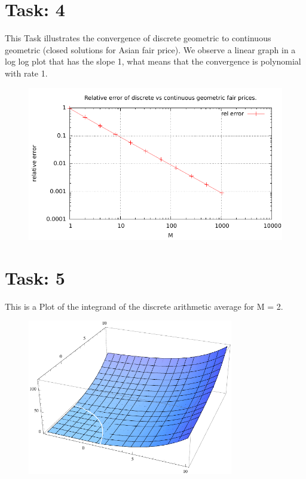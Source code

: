 \documentclass{article}
\begin{document}
\section*{Task: 4}
This Task illustrates the convergence of discrete geometric to continuous geometric (closed solutions for Asian fair price). We observe a linear graph in a log log plot that has the slope 1, what means that the convergence is polynomial with rate 1.
\begin{figure}[htbp]
  \centering
     \includegraphics[width=1.0\textwidth]{../Task04/sh3_task4_convergence_plot.pdf}
\end{figure}

\section*{Task: 5}
This is a Plot of the integrand of the discrete arithmetic average for M = 2.
\begin{figure}[htbp]
  \centering
     \includegraphics[width=0.8\textwidth]{../Task05/sh3_task5_arithmetic_payoff.pdf}
\end{figure}
\end{document}
